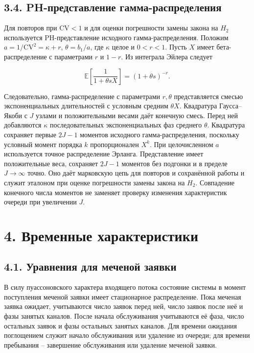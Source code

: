 \subsection*{3.4. PH-представление гамма-распределения}
Для повторов при \(\mathrm{CV}<1\) и для оценки погрешности замены закона на \(H_2\) используется PH-представление исходного гамма-распределения. Положим \(a=1/\mathrm{CV}^2=\kappa+r\), \(\theta=b_1/a\), где \(\kappa\) целое и \(0<r<1\). Пусть \(X\) имеет бета-распределение с параметрами \(r\) и \(1-r\). Из интеграла Эйлера \cite{nistdlmf} следует


\[\mathbb E\!\left[\frac{1}{1+\theta sX}\right]=(1+\theta s)^{-r}.\]


Следовательно, гамма-распределение с параметрами \(r,\theta\) представляется смесью экспоненциальных длительностей с условным средним \(\theta X\). Квадратура Гаусса--Якоби с \(J\) узлами и положительными весами даёт конечную смесь. Перед ней добавляются \(\kappa\) последовательных экспоненциальных фаз среднего \(\theta\). Квадратура сохраняет первые \(2J-1\) моментов исходного гамма-распределения, поскольку условный момент порядка \(k\) пропорционален \(X^k\). При целочисленном \(a\) используется точное распределение Эрланга. Представление имеет положительные веса, сохраняет \(2J-1\) моментов без подгонки и в пределе \(J\to\infty\) точно. Оно даёт марковскую цепь для повторов и сохранённой работы и служит эталоном при оценке погрешности замены закона на \(H_2\). Совпадение конечного числа моментов не заменяет проверку изменения характеристик очереди при увеличении \(J\).


\section*{4. Временные характеристики}
\subsection*{4.1. Уравнения для меченой заявки}
В силу пуассоновского характера входящего потока состояние системы в момент поступления меченой заявки имеет стационарное распределение. Пока меченая заявка ожидает, учитываются число заявок перед ней, число заявок после неё и фазы занятых каналов. После начала обслуживания учитываются её фаза, число остальных заявок и фазы остальных занятых каналов. Для времени ожидания поглощением служит начало обслуживания или удаление из очереди; для времени пребывания -- завершение обслуживания или удаление меченой заявки.

